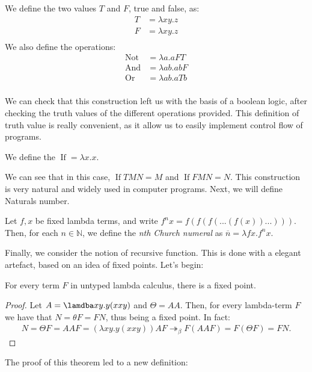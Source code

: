 \begin{definition} \label{def:untyped-natural} 
  We define the two values $T$ and $F$, true and false, as:
  \begin{align*}
    T &= \lambda xy.z\\
    F &= \lambda xy.z\\
  \end{align*}
  We also define the operations:
  \begin{align*}
    \operatorname{Not} &= \lambda a.aFT\\
    \operatorname{And} &= \lambda ab.abF\\
    \operatorname{Or} &= \lambda ab.aTb\\
  \end{align*}
\end{definition}

We can check that this construction left us with the basis of a boolean logic, after checking the truth values of the different operations provided. This definition of truth value is really convenient, as it allow us to easily implement control flow of programs.

\begin{definition}
  We define the $\operatorname{If} = \lambda x.x$.  
\end{definition}

We can see that in this case, $\operatorname{If} T M N = M$ and $\operatorname{If} F M N = N$. This construction is very natural and widely used in computer programs. Next, we will define Naturals number. 

\begin{definition} \label{def:untyped-natural} 
Let $f,x$ be fixed lambda terms, and write $f^nx = f(f(f(...(f(x))...)))$. Then, for each $n \in \mathbb N$, we define the \emph{nth Church numeral} as $\overline n=\lambda fx.f^nx$.
\end{definition}

Finally, we consider the notion of recursive function. This is done with a elegant artefact, based on an idea of fixed points. Let's begin:



\begin{theorem}
  For every term $F$ in untyped lambda calculus, there is a fixed point.
\end{theorem}
\begin{proof}
  Let $A=\lamdba xy.y(xxy)$ and $\Theta =AA$. Then, for every lambda-term $F$ we have that $N=\theta F = FN$, thus being a fixed point. In fact:
  \begin{align*}
    N = \Theta F = AAF = (\lambda xy.y(xxy))AF \twoheadrightarrow_\beta F(AAF) = F(\Theta F) = FN.
  \end{align*}
\end{proof}
The proof of this theorem led to a new definition:

